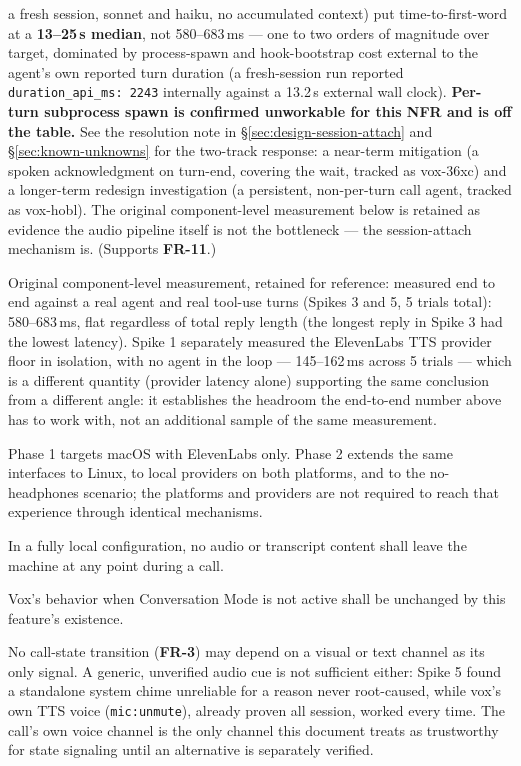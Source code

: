 \documentclass[a4paper,11pt]{report}
\newcommand{\fr}[1]{\textbf{FR-#1}}
\newcommand{\nfr}[1]{\textbf{NFR-#1}}
\newcommand{\pone}{\textsc{[p1]}}
\newcommand{\ptwo}{\textsc{[p2]}}
\begin{document}
\begin{description}
    a fresh session, sonnet and haiku, no accumulated context) put
    time-to-first-word at a \textbf{13--25\,s median}, not
    580--683\,ms --- one to two orders of magnitude over target, dominated
    by process-spawn and hook-bootstrap cost external to the agent's own
    reported turn duration (a fresh-session run reported
    \texttt{duration\_api\_ms: 2243} internally against a 13.2\,s external
    wall clock). \textbf{Per-turn subprocess spawn is confirmed
    unworkable for this NFR and is off the table.} See the resolution
    note in \S\ref{sec:design-session-attach} and \S\ref{sec:known-unknowns}
    for the two-track response: a near-term mitigation (a spoken
    acknowledgment on turn-end, covering the wait, tracked as vox-36xc)
    and a longer-term redesign investigation (a persistent, non-per-turn
    call agent, tracked as vox-hobl). The original component-level
    measurement below is retained as evidence the audio pipeline itself
    is not the bottleneck --- the session-attach mechanism is. (Supports
    \fr{11}.)

    Original component-level measurement, retained for reference:
    measured end to end against a real agent and real tool-use turns
    (Spikes 3 and 5, 5 trials total): 580--683\,ms, flat regardless of
    total reply length (the longest reply in Spike 3 had the lowest
    latency). Spike 1 separately measured the ElevenLabs TTS provider
    floor in isolation, with no agent in the loop --- 145--162\,ms across
    5 trials --- which is a different quantity (provider latency alone)
    supporting the same conclusion from a different angle: it establishes
    the headroom the end-to-end number above has to work with, not an
    additional sample of the same measurement.
  \item[\nfr{3} \ptwo{} (Platform and provider breadth)] Phase 1 targets
    macOS with ElevenLabs only. Phase 2 extends the same interfaces to
    Linux, to local providers on both platforms, and to the no-headphones
    scenario; the platforms and providers are not required to reach that
    experience through identical mechanisms.
  \item[\nfr{4} \ptwo{} (Privacy posture)] In a fully local configuration,
    no audio or transcript content shall leave the machine at any point
    during a call.
  \item[\nfr{5} \pone{} (No regression to existing behavior)] Vox's
    behavior when Conversation Mode is not active shall be unchanged by
    this feature's existence.
  \item[\nfr{6} \pone{} \textbf{(new)} (Audible-only state signaling)]
    No call-state transition (\fr{3}) may depend on a visual or text
    channel as its only signal. A generic, unverified audio cue is not
    sufficient either: Spike 5 found a standalone system chime unreliable
    for a reason never root-caused, while vox's own TTS voice
    (\texttt{mic:unmute}), already proven all session, worked every time.
    The call's own voice channel is the only channel this document treats
    as trustworthy for state signaling until an alternative is separately
    verified.
\end{description}
\end{document}
